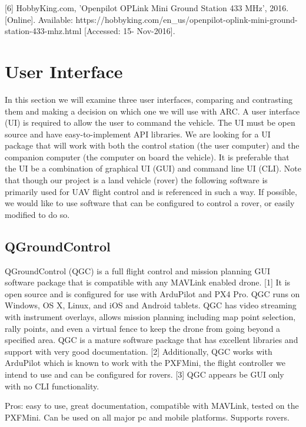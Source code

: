 \documentclass[compsoc,draftclsnofoot,onecolumn,10pt]{IEEEtran}
\begin{document}
[6] HobbyKing.com, 'Openpilot OPLink Mini Ground Station 433 MHz', 2016.  [Online]. Available: https://hobbyking.com/en\_us/openpilot-oplink-mini-ground-station-433-mhz.html [Accessed: 15- Nov-2016].\par

\newpage

\section{User Interface}
In this section we will examine three user interfaces, comparing and contrasting
them and making a decision on which one we will use with ARC.
A user interface (UI) is required to allow the user to command the vehicle. The
UI must be open source and have easy-to-implement API libraries. We are looking
for a UI package that will work with both the control station (the user
computer) and the companion computer (the computer on board the vehicle). It is
preferable that the UI be a combination of graphical UI (GUI) and command line
UI (CLI). Note that though our project is a land vehicle (rover) the following
software is primarily used for UAV flight control and is referenced in such a
way. If possible, we would like to use software that can be configured to
control a rover, or easily modified to do so.

\subsection{QGroundControl}

QGroundControl (QGC) is a full flight control and mission planning GUI software
package that is compatible with any MAVLink enabled drone. [1] It is open source and
is configured for use with ArduPilot and PX4 Pro. QGC runs on Windows, OS X,
Linux, and iOS and Android tablets. QGC has video streaming with instrument
overlays, allows mission planning including map point selection, rally points,
and even a virtual fence to keep the drone from going beyond a specified area.
QGC is a mature software package that has excellent libraries and support with
very good documentation. [2]
Additionally, QGC works with ArduPilot which is known to work with the PXFMini,
the flight controller we intend to use and can be configured for rovers. [3] QGC 
appears be GUI only with no CLI functionality.

Pros: easy to use, great documentation, compatible with MAVLink, tested on the
PXFMini. Can be used on all major pc and mobile platforms. Supports rovers.
\end{document}
